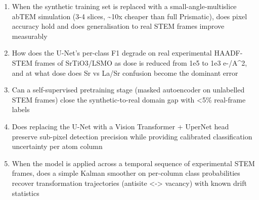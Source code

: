\begin{enumerate}[leftmargin=1.6em,itemsep=0.2em,topsep=0.2em,label=Q\arabic*.]
\item When the synthetic training set is replaced with a small-angle-multislice abTEM simulation (3-4 slices, \textasciitilde{}10x cheaper than full Prismatic), does pixel accuracy hold and does generalisation to real STEM frames improve measurably
\item How does the U-Net's per-class F1 degrade on real experimental HAADF-STEM frames of SrTiO3/LSMO as dose is reduced from 1e5 to 1e3 e-/A\textasciicircum{}2, and at what dose does Sr vs La/Sr confusion become the dominant error
\item Can a self-supervised pretraining stage (masked autoencoder on unlabelled STEM frames) close the synthetic-to-real domain gap with \textless{}5\% real-frame labels
\item Does replacing the U-Net with a Vision Transformer + UperNet head preserve sub-pixel detection precision while providing calibrated classification uncertainty per atom column
\item When the model is applied across a temporal sequence of experimental STEM frames, does a simple Kalman smoother on per-column class probabilities recover transformation trajectories (antisite \textless{}-\textgreater{} vacancy) with known drift statistics
\end{enumerate}

